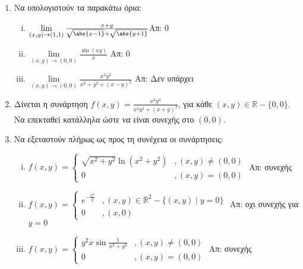 



\everymath{\displaystyle}
\thispagestyle{empty}



\begin{center}
\end{center}


\vspace{\baselineskip}

\begin{enumerate}
  \item Να υπολογιστούν τα παρακάτω όρια:
  \begin{enumerate}[i)]

    \item $\lim\limits_{(x,y)\to (1,1)}\frac{x+y}{\sqrt{\abs{x-1}}+\sqrt{\abs{y+1}}}$\hfill Απ: $0$
    \item $\lim\limits_{(x,y)\to (0,0)}\frac{\sin(xy)}{x}$ \hfill Απ: $0$
    \item $\lim\limits_{(x,y)\to (0,0)}\frac{x^{2}y^{2}}{x^{2}+y^{2}+(x-y)^{2}}$ \hfill Απ: Δεν υπάρχει
  \end{enumerate}

  \item Δίνεται η συνάρτηση $f(x,y)=\frac{x^{2}y^{2}}{x^{2}y^{2}+(x+y)^{2}}$, για κάθε $(x,y)\in \mathbb{R}-\{0,0\}$. Να επεκταθεί κατάλληλα ώστε να είναι συνεχής στο $(0,0)$.

  \item Να εξεταστούν πλήρως ως προς τη συνέχεια οι συνάρτησεις:
  \begin{enumerate}[i)]
    \item   \(
      f(x,y) = \begin{cases}
        \sqrt{x^{2}+y^{2}}\ln(x^{2}+y^{2}) &, (x,y)\neq (0,0) \\
        0 &, (x,y)=(0,0)
    \end{cases}
      \) \hfill Απ: συνεχής
      \item   \(
        f(x,y)=\begin{cases}
          e^{-\frac{x^{2}}{y}} &, (x,y)\in\mathbb{R}^{2}-\{(x,y)\mid y=0\} \\
          0 &, (x,0)
      \end{cases}
        \) \hfill Απ: οχι συνεχής για $y=0$
        \item   \(
          f(x,y)=\begin{cases}
            y^{2}x\sin \frac{1}{x^{2}+y^{2}} &, (x,y)\neq (0,0)\\
            0 &, (x,y)=(0,0)
        \end{cases}
          \) \hfill Απ: συνεχής
  \end{enumerate}


\end{enumerate}
